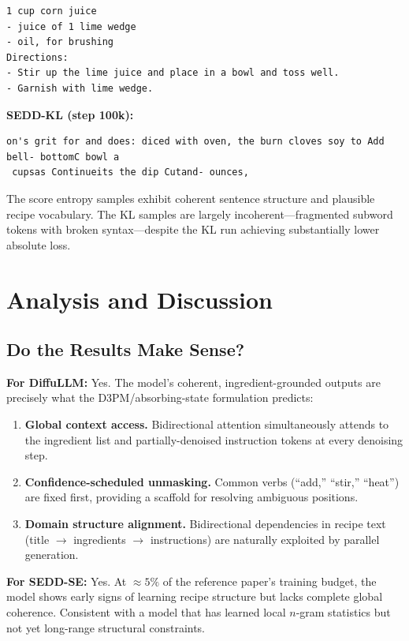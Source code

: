 \documentclass[11pt,a4paper]{article}
\begin{document}
\begin{lstlisting}
1 cup corn juice
- juice of 1 lime wedge
- oil, for brushing
Directions:
- Stir up the lime juice and place in a bowl and toss well.
- Garnish with lime wedge.
\end{lstlisting}

\textbf{SEDD-KL (step 100k):}
\begin{lstlisting}
on's grit for and does: diced with oven, the burn cloves soy to Add
bell- bottomC bowl a
 cupsas Continueits the dip Cutand- ounces,
\end{lstlisting}

The score entropy samples exhibit coherent sentence structure and plausible recipe vocabulary. The KL samples are largely incoherent---fragmented subword tokens with broken syntax---despite the KL run achieving substantially lower absolute loss.

\section{Analysis and Discussion}

\subsection{Do the Results Make Sense?}

\textbf{For DiffuLLM:} Yes. The model's coherent, ingredient-grounded outputs are precisely what the D3PM/absorbing-state formulation predicts:
\begin{enumerate}[nosep]
  \item \textbf{Global context access.} Bidirectional attention simultaneously attends to the ingredient list and partially-denoised instruction tokens at every denoising step.
  \item \textbf{Confidence-scheduled unmasking.} Common verbs (``add,'' ``stir,'' ``heat'') are fixed first, providing a scaffold for resolving ambiguous positions.
  \item \textbf{Domain structure alignment.} Bidirectional dependencies in recipe text (title $\to$ ingredients $\to$ instructions) are naturally exploited by parallel generation.
\end{enumerate}

\textbf{For SEDD-SE:} Yes. At $\approx 5\%$ of the reference paper's training budget, the model shows early signs of learning recipe structure but lacks complete global coherence. Consistent with a model that has learned local $n$-gram statistics but not yet long-range structural constraints.
\end{document}

